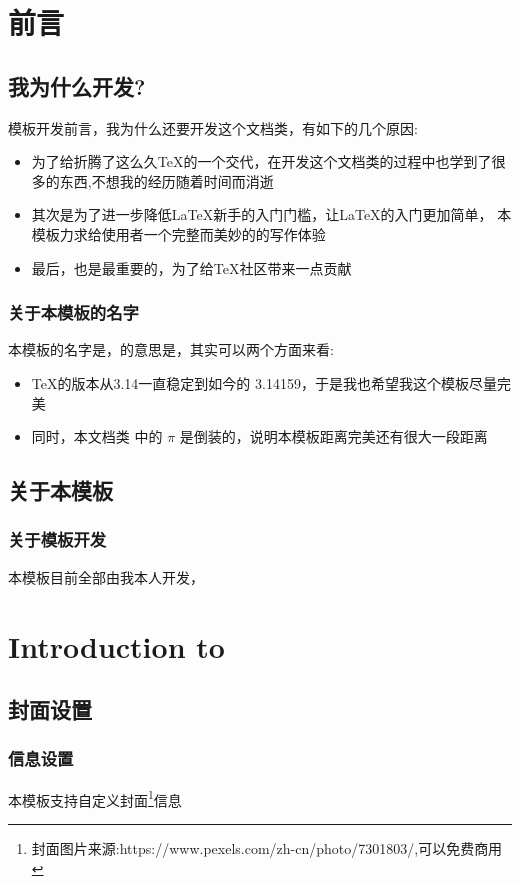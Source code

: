 \documentclass[lang=cn, math=mathptmx]{ZLaTeX}
\begin{document}
\contents[.8]
\clearpage

\chapter{前言}
\section{我为什么开发\zlatex{}?}
模板开发前言，我为什么还要开发这个文档类，有如下的几个原因:
\begin{itemize}
    \item 为了给折腾了这么久\TeX{}的一个交代，在开发这个文档类的过程中也学到了很多的东西,不想我的经历随着时间而消逝
    \item 其次是为了进一步降低\LaTeX{}新手的入门门槛，让\LaTeX{}的入门更加简单，
        本模板力求给使用者一个完整而美妙的的写作体验
    \item 最后，也是最重要的，为了给\TeX{}社区带来一点贡献
\end{itemize}
\subsection{关于本模板的名字}
本模板的名字是\zlatex{}，\zlatex{}的意思是，其实可以两个方面来看:
\begin{itemize}
    \item \TeX{}的版本从3.14一直稳定到如今的 3.14159，于是我也希望我这个模板尽量完美
    \item 同时，本文档类 \zlatex{}中的 $\pi$ 是倒装的，说明本模板距离完美还有很大一段距离
\end{itemize}

\section{关于本模板}
\subsection{关于模板开发}
本模板目前全部由我本人开发，




\chapter{Introduction to \zlatex}
\section{封面设置}
\subsection{信息设置}
本模板支持自定义封面\footnote[1]{封面图片来源:https://www.pexels.com/zh-cn/photo/7301803/,可以免费商用}信息
\end{document}
